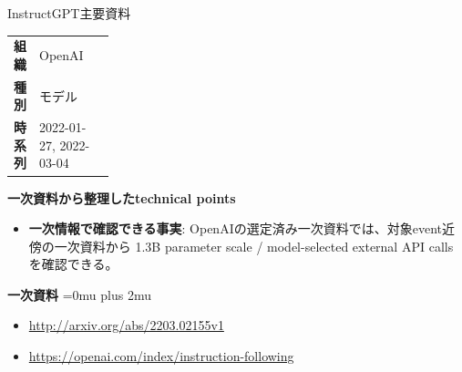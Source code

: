 \begin{technicalnote}{InstructGPT}{主要資料}
\begingroup
\begin{tabularx}{\linewidth}{@{}>{\bfseries}p{0.22\linewidth}X@{}}
組織 & OpenAI \\
種別 & モデル \\
時系列 & 2022-01-27, 2022-03-04 \\
\end{tabularx}
\smallskip
{\bfseries 一次資料から整理したtechnical points}
\begin{itemize}[leftmargin=1.5em,itemsep=0.35em]
\item \textbf{一次情報で確認できる事実}: OpenAIの選定済み一次資料では、対象event近傍の一次資料から 1.3B parameter scale / model-selected external API calls を確認できる。
\end{itemize}
\begin{minipage}{\linewidth}
\begin{samepage}
{\bfseries 一次資料}
\begingroup\sloppy
\Urlmuskip=0mu plus 2mu\relax
\begin{itemize}[leftmargin=1.5em,itemsep=0.25em]
\item {\scriptsize\url{http://arxiv.org/abs/2203.02155v1}}
\item {\scriptsize\url{https://openai.com/index/instruction-following}}
\end{itemize}
\endgroup
\end{samepage}
\end{minipage}
\endgroup
\end{technicalnote}
\medskip

